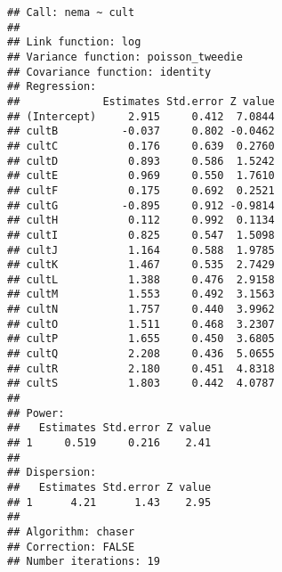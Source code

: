 \documentclass[9pt,a5paper,]{book}
\newenvironment{Shaded}{}{}
\newcommand{\KeywordTok}[1]{\textbf{{#1}}}
\newcommand{\DataTypeTok}[1]{\underline{{#1}}}
\newcommand{\DecValTok}[1]{{#1}}
\newcommand{\StringTok}[1]{{#1}}
\newcommand{\CommentTok}[1]{\textit{{#1}}}
\newcommand{\OtherTok}[1]{{#1}}
\newcommand{\NormalTok}[1]{{#1}}
\renewenvironment{Shaded}{\color{inputcolor}}{}
\renewcommand{\DataTypeTok}[1]{{#1}}
\theoremstyle{definition}
\theoremstyle{definition}
\theoremstyle{remark}
\begin{document}
\begin{verbatim}
## Call: nema ~ cult
## 
## Link function: log
## Variance function: poisson_tweedie
## Covariance function: identity
## Regression:
##             Estimates Std.error Z value
## (Intercept)     2.915     0.412  7.0844
## cultB          -0.037     0.802 -0.0462
## cultC           0.176     0.639  0.2760
## cultD           0.893     0.586  1.5242
## cultE           0.969     0.550  1.7610
## cultF           0.175     0.692  0.2521
## cultG          -0.895     0.912 -0.9814
## cultH           0.112     0.992  0.1134
## cultI           0.825     0.547  1.5098
## cultJ           1.164     0.588  1.9785
## cultK           1.467     0.535  2.7429
## cultL           1.388     0.476  2.9158
## cultM           1.553     0.492  3.1563
## cultN           1.757     0.440  3.9962
## cultO           1.511     0.468  3.2307
## cultP           1.655     0.450  3.6805
## cultQ           2.208     0.436  5.0655
## cultR           2.180     0.451  4.8318
## cultS           1.803     0.442  4.0787
## 
## Power:
##   Estimates Std.error Z value
## 1     0.519     0.216    2.41
## 
## Dispersion:
##   Estimates Std.error Z value
## 1      4.21      1.43    2.95
## 
## Algorithm: chaser
## Correction: FALSE
## Number iterations: 19
\end{verbatim}

\begin{Shaded}
\end{Shaded}

\begin{Shaded}
\end{Shaded}
\end{document}

